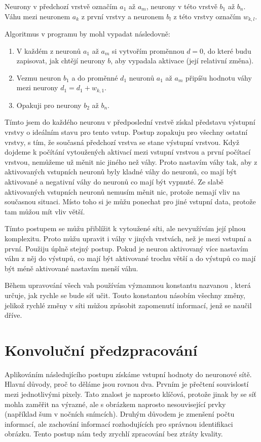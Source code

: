 \documentclass[12pt,a4paper]{report}
\begin{document}
	Neurony v předchozí vrstvě označím $a_1$ až $a_m$, neurony v této vrstvě $b_1$ až $b_n$. Váhu mezi neuronem $a_k$ z první vrstvy a neuronem $b_l$ z této vrstvy označím $w_{k,l}$.
	
	Algoritmus v programu by mohl vypadat následovně:
	\begin{enumerate}
		\item V každém z neuronů $a_1$ až $a_m$ si vytvořím proměnnou $d=0$, do které budu zapisovat, jak chtějí neurony $b$, aby vypadala aktivace (její relativní změna).
		\item Vezmu neuron $b_1$ a do proměnné $d_1$ neuronů $a_1$ až $a_m$ připíšu hodnotu váhy mezi neurony $d_1=d_1+w_{k,1}$.
		\item Opakuji pro neurony $b_2$ až $b_n$.
	\end{enumerate}
	Tímto jsem do každého neuronu v předposlední vrstvě získal představu výstupní vrstvy o ideálním stavu pro tento vstup. Postup zopakuju pro všechny ostatní vrstvy, s tím, že současná předchozí vrstva se stane výstupní vrstvou. Když dojdeme k počítání vytoužených aktivací mezi vstupní vrstvou a první počítací vrstvou, nemůžeme už měnit nic jiného než váhy. Proto nastavím váhy tak, aby z aktivovaných vstupních neuronů byly kladné váhy do neuronů, co mají být aktivované a negativní váhy do neuronů co mají být vypnuté. Ze slabě aktivovaných vstupních neuronů nemusím měnit nic, protože nemají vliv na současnou situaci. Místo toho si je můžu ponechat pro jiné vstupní data, protože tam můžou mít vliv větší.
	
	Tímto postupem se můžu přiblížit k vytoužené síti, ale nevyužívám její plnou komplexitu. Proto můžu upravit i váhy v jiných vrstvách, než je mezi vstupní a první. Použiju úplně stejný postup. Pokud je neuron aktivovaný více nastavím váhu z něj do výstupů, co mají být aktivované trochu větší a do výstupů co mají být méně aktivované nastavím menší váhu.
	
	Během upravování všech vah používám významnou konstantu nazvanou , která určuje, jak rychle se bude síť učit. Touto konstantou násobím všechny změny, jelikož rychlé změny v síti můžou způsobit zapomenutí informací, jenž se naučil dříve.
	
\chapter{Konvoluční předzpracování}
Aplikováním následujícího postupu získáme vstupní hodnoty do neuronové sítě. Hlavní důvody, proč to děláme jsou rovnou dva. Prvním je přečtení souvislostí mezi jednotlivými pixely. Tato znalost je naprosto klíčová, protože jinak by se síť mohla zaměřit na výrazné, ale s obrázkem naprosto nesouvisející prvky (například šum v nočních snímcích). Druhým důvodem je zmenšení počtu informací, ale zachování informací rozhodujících pro správnou identifikaci obrázku. Tento postup nám tedy zrychlí zpracování bez ztráty kvality.
\end{document}
